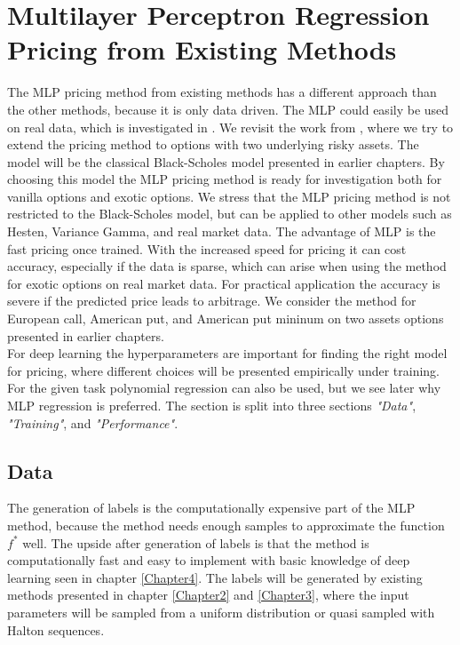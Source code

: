 \section{Multilayer Perceptron Regression Pricing from Existing Methods}
The MLP pricing method from existing methods has a different approach than the other methods, because it is only data driven. The MLP could easily be used on real data, which is investigated in \parencite{GasparRaquel20}. We revisit the work from \parencite{HirsaAli2019}, where we try to extend the pricing method to options with two underlying risky assets. The model will be the classical Black-Scholes model presented in earlier chapters. By choosing this model the MLP pricing method is ready for investigation both for vanilla options and exotic options. We stress that the MLP pricing method is not restricted to the Black-Scholes model, but can be applied to other models such as Hesten, Variance Gamma, and real market data. The advantage of MLP is the fast pricing once trained. With the increased speed for pricing it can cost accuracy, especially if the data is sparse, which can arise when using the method for exotic options on real market data. For practical application the accuracy is severe if the predicted price leads to arbitrage. We consider the method for European call, American put, and American put mininum on two assets options presented in earlier chapters.\\

For deep learning the hyperparameters are important for finding the right model for pricing, where different choices will be presented empirically under training. For the given task polynomial regression can also be used, but we see later why MLP regression is preferred. The section is split into three sections \textsl{"Data"}, \textsl{"Training"}, and \textsl{"Performance"}.

\subsection{Data}
The generation of labels is the computationally expensive part of the MLP method, because the method needs enough samples to approximate the function $f^*$ well. The upside after generation of labels is that the method is computationally fast and easy to implement with basic knowledge of deep learning seen in chapter \ref{Chapter4}. The labels will be generated by existing methods presented in chapter \ref{Chapter2} and \ref{Chapter3}, where the input parameters will be sampled from a uniform distribution or quasi sampled with Halton sequences.\\

